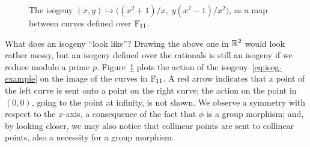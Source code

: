 \documentclass{report}
\theoremstyle{plain}
\theoremstyle{definition}
\begin{document}
\begin{figure}
  \centering
  \caption{The isogeny $(x,y) \mapsto \bigl((x^2+1)/x,\;y(x^2-1)/x^2\bigr)$,
    as a map between curves defined over $\mathbb{F}_{11}$.}
  \label{fig:isog-example}
\end{figure}


What does an isogeny ``look like''? %
Drawing the above one in $\mathbb{R}^2$ would look rather messy, but an
isogeny defined over the rationals is still an isogeny if we reduce
modulo a prime $p$. %
Figure~\ref{fig:isog-example} plots the action of the
isogeny~\eqref{eq:isog-example} on the image of the curves in
$\mathbb{F}_{11}$. %
A red arrow indicates that a point of the left curve is sent onto a
point on the right curve; the action on the point in $(0,0)$, going to
the point at infinity, is not shown. %
We observe a symmetry with respect to the $x$-axis, a consequence of
the fact that $ϕ$ is a group morphism; and, by looking closer, we may
also notice that collinear points are sent to collinear points, also a
necessity for a group morphism. %
\end{document}

